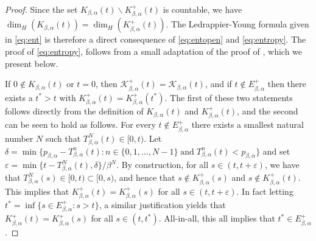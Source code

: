 \documentclass[a4paper,reqno,10pt]{amsart}
\begin{document}
\begin{proof}
Since the set $K_{\beta,\alpha}(t)\backslash K^{+}_{\beta,\alpha}(t)$ is countable, we have $\dim_H(K_{\beta,\alpha}(t))=\dim_H(K^{+}_{\beta,\alpha}(t))$. The Ledrappier-Young formula given in \eqref{eq:ent} is therefore a direct consequence of \eqref{eq:entopen} and \eqref{eq:entropy}. The proof of \eqref{eq:entropy}, follows from a small adaptation of the proof of \cite[Proposition 2.6]{KKLL}, which we present below.

If $0 \not\in K_{\beta,\alpha}(t)$ or $t=0$, then $\mathcal{K}^{+}_{\beta,\alpha}(t) =\mathcal{K}_{\beta,\alpha}(t)$, and if $t\not \in E^{+}_{\beta,\alpha}$ then there exists a $t^*>t$ with $K^{+}_{\beta,\alpha}(t)=K^{+}_{\beta,\alpha}(t^*)$.  The first of these two statements follows directly from the definition of $K_{\beta,\alpha}(t)$ and $K_{\beta,\alpha}^{+}(t)$, and the second can be seen to hold as follows.  For every $t \not\in E^{+}_{\beta,\alpha}$ there exists a smallest natural number $N$ such that $T_{\beta,\alpha}^N(t) \in [0,t)$. Let $\delta = \min \{ p_{\beta, \alpha} - T_{\beta,\alpha}^{n}(t) \colon n \in \{ 0, 1, \dots, N-1 \} \; \text{and} \; T_{\beta,\alpha}^{n}(t) < p_{\beta, \alpha} \}$ and set $\varepsilon = \min\{t-T_{\beta,\alpha}^N(t), \delta\}/\beta^{N}$. By construction, for all $s\in (t,t+\varepsilon)$, we have that $T_{\beta,\alpha}^N(s)\in [0,t) \subset [0, s)$, and hence that $s\not\in K^{+}_{\beta,\alpha}(s)$ and $s\not\in K^{+}_{\beta,\alpha}(t) $. This implies that $K^{+}_{\beta,\alpha}(t)= K^{+}_{\beta,\alpha}(s)$ for all $s\in (t,t+\varepsilon)$.  In fact letting $t^{*} = \inf \{ s \in E^{+}_{\beta,\alpha} \colon s > t \}$, a similar justification yields that $K^{+}_{\beta,\alpha}(t)= K^{+}_{\beta,\alpha}(s)$ for all $s \in (t,t^*)$.
All-in-all, this all implies that $t^* \in E^{+}_{\beta,\alpha}$.


\end{proof}
\end{document}
